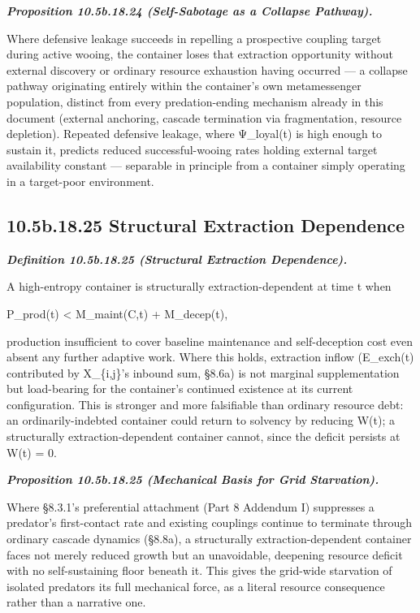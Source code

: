 \documentclass[
]{article}
\begin{document}
\emph{\textbf{Proposition 10.5b.18.24 (Self-Sabotage as a Collapse
Pathway).}}

Where defensive leakage succeeds in repelling a prospective coupling
target during active wooing, the container loses that extraction
opportunity without external discovery or ordinary resource exhaustion
having occurred --- a collapse pathway originating entirely within the
container's own metamessenger population, distinct from every
predation-ending mechanism already in this document (external anchoring,
cascade termination via fragmentation, resource depletion). Repeated
defensive leakage, where Ψ\_loyal(t) is high enough to sustain it,
predicts reduced successful-wooing rates holding external target
availability constant --- separable in principle from a container simply
operating in a target-poor environment.

\hypertarget{b.18.25-structural-extraction-dependence}{%
\subsection{10.5b.18.25 Structural Extraction
Dependence}\label{b.18.25-structural-extraction-dependence}}

\emph{\textbf{Definition 10.5b.18.25 (Structural Extraction
Dependence).}}

A high-entropy container is structurally extraction-dependent at time t
when

P\_prod(t) \textless{} M\_maint(C,t) + M\_decep(t),

production insufficient to cover baseline maintenance and self-deception
cost even absent any further adaptive work. Where this holds, extraction
inflow (E\_exch(t) contributed by X\_\{i,j\}'s inbound sum, §8.6a) is
not marginal supplementation but load-bearing for the container's
continued existence at its current configuration. This is stronger and
more falsifiable than ordinary resource debt: an ordinarily-indebted
container could return to solvency by reducing W(t); a structurally
extraction-dependent container cannot, since the deficit persists at
W(t) = 0.

\emph{\textbf{Proposition 10.5b.18.25 (Mechanical Basis for Grid
Starvation).}}

Where §8.3.1's preferential attachment (Part 8 Addendum I) suppresses a
predator's first-contact rate and existing couplings continue to
terminate through ordinary cascade dynamics (§8.8a), a structurally
extraction-dependent container faces not merely reduced growth but an
unavoidable, deepening resource deficit with no self-sustaining floor
beneath it. This gives the grid-wide starvation of isolated predators
its full mechanical force, as a literal resource consequence rather than
a narrative one.
\end{document}
